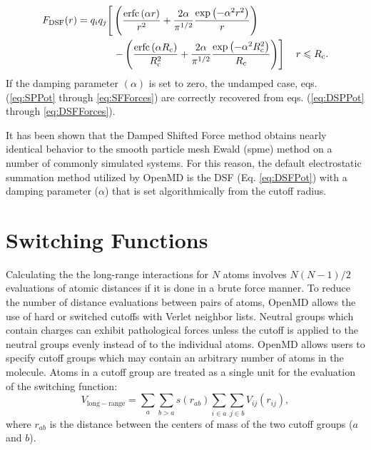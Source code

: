 \documentclass[]{book}
\begin{document}
\begin{equation}
\begin{split}
F_\mathrm{DSF}(r) =
q_iq_j\Biggr{[}&\left(\frac{\textrm{erfc}\left(\alpha r\right)}{r^2}+\frac{2\alpha}{\pi^{1/2}}\frac{\exp{\left(-\alpha^2r^2\right)}}{r}\right) \\ &\left.-\left(\frac{\textrm{erfc}\left(\alpha R_{\textrm{c}}\right)}{R_{\textrm{c}}^2}+\frac{2\alpha}{\pi^{1/2}}\frac{\exp{\left(-\alpha^2R_{\textrm{c}}^2
\right)}}{R_{\textrm{c}}}\right)\right] \quad r\leqslant R_\textrm{c}.
\label{eq:DSFForces}
\end{split}
\end{equation}
If the damping parameter $(\alpha)$ is set to zero, the undamped case,
eqs. (\ref{eq:SPPot} through \ref{eq:SFForces}) are correctly
recovered from eqs. (\ref{eq:DSPPot} through \ref{eq:DSFForces}).

It has been shown that the Damped Shifted Force method obtains nearly
identical behavior to the smooth particle mesh Ewald ({\sc spme})
method on a number of commonly simulated systems.\cite{Fennell06}  For
this reason, the default electrostatic summation method utilized by
{\sc OpenMD} is the DSF (Eq. \ref{eq:DSFPot}) with a damping parameter
($\alpha$) that is set algorithmically from the cutoff radius.


\section{\label{section:cutoffGroups}Switching Functions}

Calculating the the long-range interactions for $N$ atoms involves
$N(N-1)/2$ evaluations of atomic distances if it is done in a brute
force manner.  To reduce the number of distance evaluations between
pairs of atoms, {\sc OpenMD} allows the use of hard or switched
cutoffs with Verlet neighbor lists.\cite{Allen87} Neutral groups which
contain charges can exhibit pathological forces unless the cutoff is
applied to the neutral groups evenly instead of to the individual
atoms.\cite{leach01:mm} {\sc OpenMD} allows users to specify cutoff
groups which may contain an arbitrary number of atoms in the molecule.
Atoms in a cutoff group are treated as a single unit for the
evaluation of the switching function:
\begin{equation}
V_{\mathrm{long-range}} = \sum_{a} \sum_{b>a} s(r_{ab}) \sum_{i \in a} \sum_{j \in b} V_{ij}(r_{ij}),
\end{equation}
where $r_{ab}$ is the distance between the centers of mass of the two
cutoff groups ($a$ and $b$).
\end{document}
